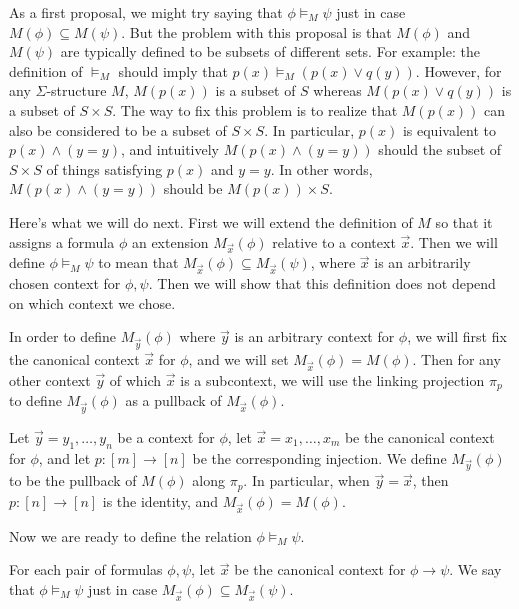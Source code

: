 As a first proposal, we might try saying that $\phi\vDash _M\psi$ just
in case $M(\phi )\subseteq M(\psi )$.  But the problem with this
proposal is that $M(\phi )$ and $M(\psi )$ are typically defined to be
subsets of different sets.  For example: the definition of $\vDash _M$
should imply that $p(x)\vDash _M(p(x)\vee q(y))$.  However, for any
$\Sigma$-structure $M$, $M(p(x))$ is a subset of $S$ whereas
$M(p(x)\vee q(y))$ is a subset of $S\times S$.  The way to fix this
problem is to realize that $M(p(x))$ can also be considered to be a
subset of $S\times S$.  In particular, $p(x)$ is equivalent to
$p(x)\wedge (y=y)$, and intuitively $M(p(x)\wedge (y=y))$ should the
subset of $S\times S$ of things satisfying $p(x)$ and $y=y$.  In other
words, $M(p(x)\wedge (y=y))$ should be $M(p(x))\times S$.

Here's what we will do next.  First we will extend the definition of
$M$ so that it assigns a formula $\phi$ an extension
$M_{\vec{x}}(\phi )$ relative to a context $\vec{x}$.  Then we will
define $\phi\vDash _M\psi$ to mean that
$M_{\vec{x}}(\phi )\subseteq M_{\vec{x}}(\psi )$, where $\vec{x}$ is
an arbitrarily chosen context for $\phi ,\psi$.  Then we will show
that this definition does not depend on which context we chose.

In order to define $M_{\vec{y}}(\phi )$ where $\vec{y}$ is an
arbitrary context for $\phi$, we will first fix the canonical context
$\vec{x}$ for $\phi$, and we will set $M_{\vec{x}}(\phi )=M(\phi )$.
Then for any other context $\vec{y}$ of which $\vec{x}$ is a
subcontext, we will use the linking projection $\pi _p$ to define
$M_{\vec{y}}(\phi )$ as a pullback of $M_{\vec{x}}(\phi )$.

\begin{defn} Let $\vec{y}=y_1,\dots ,y_n$ be a context for $\phi$, let
  $\vec{x}=x_1,\dots ,x_m$ be the canonical context for $\phi$, and
  let $p:[m]\to [n]$ be the corresponding injection.  We define
  $M_{\vec{y}}(\phi )$ to be the pullback of $M(\phi )$ along
  $\pi _p$.  In particular, when $\vec{y}=\vec{x}$, then
  $p:[n]\to [n]$ is the identity, and $M_{\vec{x}}(\phi )=M(\phi
  )$. \end{defn}

Now we are ready to define the relation $\phi\vDash _M\psi$.

\begin{defn} For each pair of formulas $\phi ,\psi$, let $\vec{x}$ be
  the canonical context for $\phi\to\psi$.  We say that
  $\phi\vDash _M\psi$ just in case
  $M_{\vec{x}}(\phi )\subseteq M_{\vec{x}}(\psi )$.
\end{defn}

